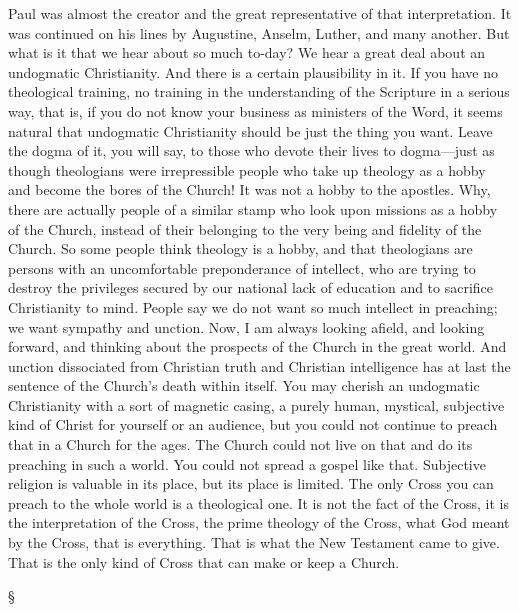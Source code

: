 \documentclass[12pt,letterpaper,oneside]{book}
\begin{document}
Paul was almost the creator and the great 
representative of that interpretation. It was 
continued on his lines by Augustine, Anselm, 
Luther, and many another. But what is it 
that we hear about so much to-day? We 
hear a great deal about an undogmatic Christianity. 
And there is a certain plausibility in 
it. If you have no theological training, no 
training in the understanding of the Scripture 
in a serious way, that is, if you do not know 
your business as ministers of the Word, it seems 
natural that undogmatic Christianity should be 
just the thing you want. Leave the dogma 
of it, you will say, to those who devote their 
lives to dogma---just as though theologians were 
irrepressible people who take up theology as a 
hobby and become the bores of the Church! 
It was not a hobby to the apostles. Why, 
there are actually people of a similar stamp 
who look upon missions as a hobby of the 
Church, instead of their belonging to the 
very being and fidelity of the Church. So 
some people think theology is a hobby, and 
that theologians are persons with an uncomfortable 
preponderance of intellect, who are 
trying to destroy the privileges secured by 
our national lack of education and to sacrifice 
Christianity to mind. People say we do not 
want so much intellect in preaching; we want 
sympathy and unction. Now, I am always looking 
afield, and looking forward, and thinking 
about the prospects of the Church in the great 
world. And unction dissociated from Christian 
truth and Christian intelligence has at last the 
sentence of the Church's death within itself. 
You may cherish an undogmatic Christianity 
with a sort of magnetic casing, a purely human, 
mystical, subjective kind of Christ for yourself 
or an audience, but you could not continue to 
preach that in a Church for the ages. The 
Church could not live on that and do its 
preaching in such a world. You could not 
spread a gospel like that. Subjective religion 
is valuable in its place, but its place is limited. 
The only Cross you can preach to the whole 
world is a theological one. It is not the fact 
of the Cross, it is the interpretation of the 
Cross, the prime theology of the Cross, what 
God meant by the Cross, that is everything. 
That is what the New Testament came to 
give. That is the only kind of Cross that 
can make or keep a Church.

\begin{center}
\S
\end{center} 
\end{document}
